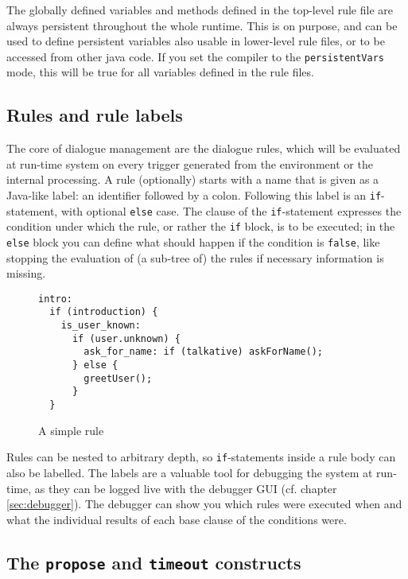 The globally defined variables and methods defined in the top-level rule file
are always persistent throughout the whole runtime. This is on purpose, and
can be used to define persistent variables also usable in lower-level
rule files, or to be accessed from other java code. If you set the compiler to
the \texttt{persistentVars} mode, this will be true for all variables defined
in the rule files.

\subsection{Rules and rule labels}

The core of \vonda dialogue management are the dialogue rules, which will be
evaluated at run-time system on every trigger generated from the environment or
the internal processing.
A rule (optionally) starts with a name that is given as a Java-like label: an
identifier followed by a colon. Following this label is an
\texttt{if}-statement, with optional \texttt{else} case. The clause of the
\texttt{if}-statement expresses the condition under which the rule, or rather
the \texttt{if} block, is to be executed; in the \texttt{else} block you can
define what should happen if the condition is \texttt{false}, like stopping the
evaluation of (a sub-tree of) the rules if necessary information is missing.

\begin{figure}[htb]
\begin{small}
\begin{lstlisting}
intro:
  if (introduction) {
    is_user_known:
      if (user.unknown) {
        ask_for_name: if (talkative) askForName();
      } else {
        greetUser();
      }
  }
\end{lstlisting}
\end{small}\vspace{-2ex}
\caption{A simple rule}
\end{figure}

Rules can be nested to arbitrary depth, so \texttt{if}-statements inside a rule
body can also be labelled. The labels are a valuable tool for debugging the
system at run-time, as they can be logged live with the debugger GUI
(cf. chapter \ref{sec:debugger}). The debugger can show you which rules were
executed when and what the individual results of each base clause of the
conditions were.

\subsection{The \texttt{propose} and \texttt{timeout} constructs}

